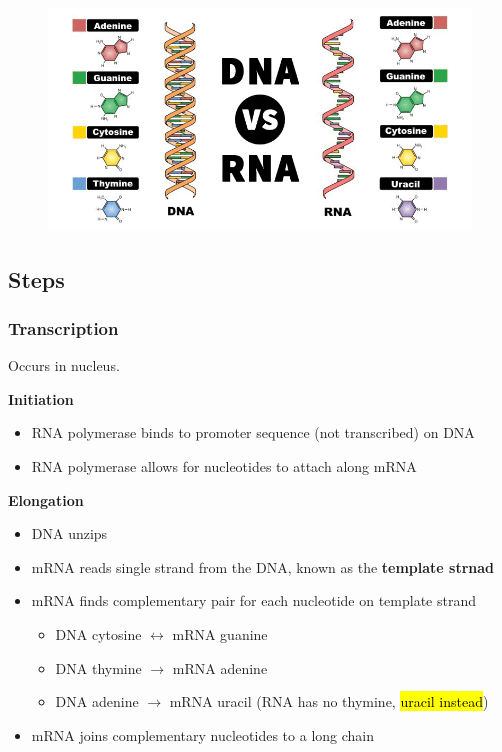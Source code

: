 \documentclass[a4paper,12pt]{article}
\begin{document}
\begin{figure}[H]
    \centering
    \includegraphics[width=\textwidth]{dnarna}
\end{figure}

\subsection{Steps}

\subsubsection{Transcription}
Occurs in nucleus.

\textbf{Initiation}
\begin{itemize}
    \item{RNA polymerase binds to promoter sequence (not transcribed) on DNA}
    \item{RNA polymerase allows for nucleotides to attach along mRNA}
        \\
\end{itemize}

\textbf{Elongation}
\begin{itemize}
    \item{DNA unzips}
    \item{mRNA reads single strand from the DNA, known as the \textbf{template strnad}}
    \item{
            mRNA finds complementary pair for each nucleotide on template strand
            \begin{itemize}
                \item{DNA cytosine $\longleftrightarrow$ mRNA guanine}
                \item{DNA thymine $\longrightarrow$ mRNA adenine}
                \item{DNA adenine $\longrightarrow$ mRNA uracil (RNA has no thymine, \hl{uracil instead})}
            \end{itemize}
        }
    \item{mRNA joins complementary nucleotides to a long chain}
        \\
\end{itemize}
\end{document}
